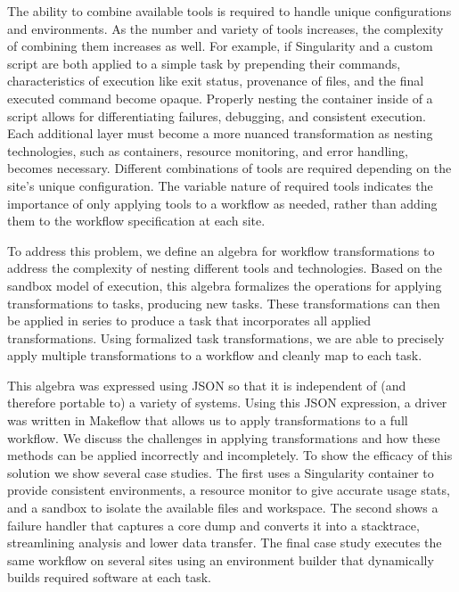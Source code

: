 \documentclass[conference]{IEEEtran}
\begin{document}
The ability to combine available tools is required
to handle unique configurations and environments.
As the number and variety of tools increases, 
the complexity of combining them increases as well.
For example, if 
Singularity and a custom script
are both applied to a simple task by prepending their
commands, characteristics of execution like
exit status, provenance of files, and
the final executed command become opaque.
Properly nesting the container inside of a
script allows for differentiating failures, 
debugging, and consistent execution.
Each additional layer must become a more nuanced transformation
as nesting technologies, 
such as containers,
resource monitoring, 
and error handling,
becomes necessary.
Different combinations of tools are required
depending on the site's unique configuration.
The variable nature of required tools indicates
the importance of only applying tools to a workflow as needed, 
rather than adding them to the workflow specification at each site.

To address this problem,
we define an algebra for workflow transformations
to address the complexity of
nesting different tools and technologies.
Based on the sandbox model of execution, 
this algebra formalizes the operations
for applying transformations to tasks, 
producing new tasks.
These transformations can then be applied
in series to produce a task that incorporates
all applied transformations.
Using formalized task transformations,
we are able to precisely apply multiple transformations to a workflow 
and cleanly map to each task.

This algebra was expressed using JSON 
so that it is independent of
(and therefore portable to)
a variety of systems. 
Using this JSON expression, a driver was written
in Makeflow\cite{makeflow-sweet12} that allows us to apply transformations 
to a full workflow.
We discuss the challenges 
in applying transformations and 
how these methods can
be applied incorrectly and incompletely. 
To show the efficacy of this solution
we show several case studies. 
The first uses a Singularity container 
to provide consistent environments, 
a resource monitor to give accurate usage stats, and
a sandbox to isolate the available files and workspace.
The second shows a failure handler that captures a
core dump and converts it into a stacktrace, 
streamlining analysis and lower data transfer.
The final case study executes the same workflow on
several sites using an environment builder 
that dynamically builds required software at each task. 
\end{document}
